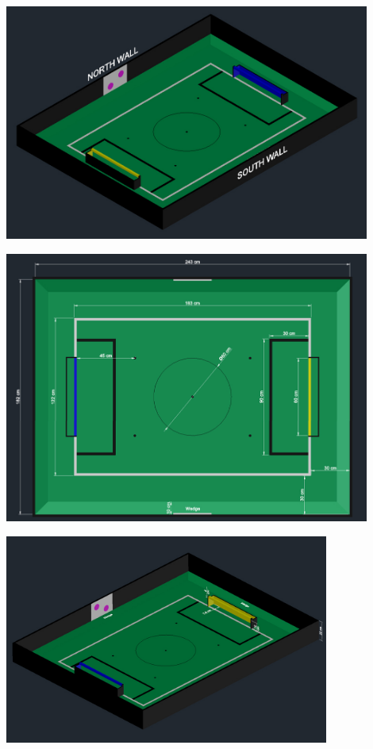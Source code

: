 \documentclass{article}
\begin{document}
\begin{center}

\includegraphics[width=0.9\textwidth]{media/image5_new.jpeg}

\includegraphics[width=0.9\textwidth]{media/image6_new.jpeg}

\includegraphics[width=0.8\textwidth]{media/image7_new.jpeg}

\end{center}
\end{document}

